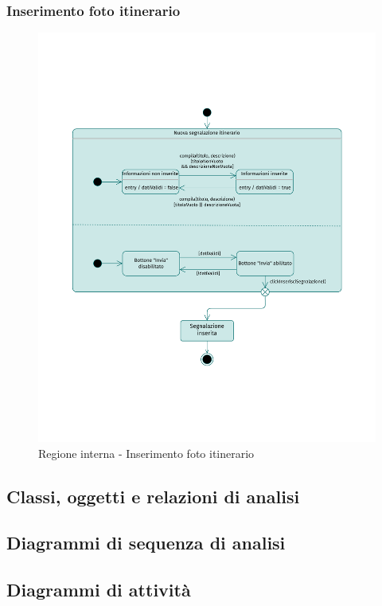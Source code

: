 \documentclass{natourDoc}
\begin{document}
	\subsubsection{Inserimento foto itinerario}
	\begin{figure}[!htbp]
		\centering
		\includegraphics[width=\textwidth, page=5]{./diagrams/statechart.pdf}
		\caption{Regione interna - Inserimento foto itinerario}
	\end{figure}
	\FloatBarrier

	\newpage
	\subsection{Classi, oggetti e relazioni di analisi}

	\newpage
	\subsection{Diagrammi di sequenza di analisi}

	\newpage
	\subsection{Diagrammi di attività}
\end{document}
